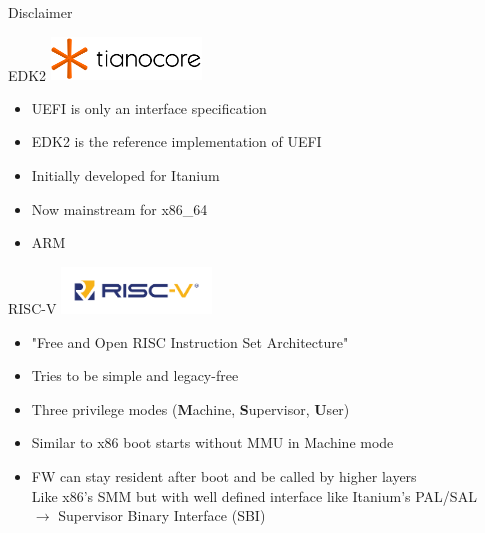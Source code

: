 \documentclass[
  10pt
]{beamer}
\begin{document}
\begin{frame}{Disclaimer}
\end{frame}

\begin{frame}{EDK2}
  \centering
  \includegraphics[width=0.3\textwidth]{resources/tianocore-logo.png}

  \vfill

  \begin{itemize}
    \item UEFI is only an interface specification
    \item EDK2 is the reference implementation of UEFI
    \item Initially developed for Itanium
    \item Now mainstream for x86\_64
    \item ARM %
  \end{itemize}
\end{frame}

\begin{frame}{RISC-V}
  \centering
  \includegraphics[width=0.3\textwidth]{resources/riscv-logo.png}

  \vfill

  \begin{itemize}
    \item "Free and Open RISC Instruction Set Architecture"
    \item Tries to be simple and legacy-free
    \item Three privilege modes (\textbf{M}achine, \textbf{S}upervisor, \textbf{U}ser)
    \item Similar to x86 boot starts without MMU in Machine mode
    \item FW can stay resident after boot and be called by higher layers \\
          Like x86's SMM but with well defined interface like Itanium's PAL/SAL \\
          $\rightarrow$ Supervisor Binary Interface (SBI)
  \end{itemize}
\end{frame}
\end{document}
